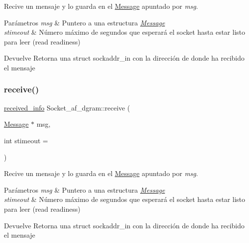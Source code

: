 Recive un mensaje y lo guarda en el \hyperlink{structMessage}{Message} apuntado por {\itshape msg}. 


\begin{DoxyParams}{Parámetros}
{\em msg} & Puntero a una estructura {\itshape \hyperlink{structMessage}{Message}} \\
\hline
{\em stimeout} & Número máximo de segundos que esperará el socket hasta estar listo para leer (read readiness) \\
\hline
\end{DoxyParams}
\begin{DoxyReturn}{Devuelve}
Retorna una struct sockaddr\+\_\+in con la dirección de donde ha recibido el mensaje 
\end{DoxyReturn}
\mbox{\label{classSocket__af__dgram_ac7d122d2317d980c48964076c3c7e2bb}} 
\subsubsection{\texorpdfstring{receive()}{receive()}\hspace{0.1cm}{\footnotesize\ttfamily [2/2]}}
{\footnotesize\ttfamily \hyperlink{structreceived__info}{received\+\_\+info} Socket\+\_\+af\+\_\+dgram\+::receive (\begin{DoxyParamCaption}\item[{\hyperlink{structMessage}{Message} $\ast$}]{msg,  }\item[{int}]{stimeout = {} }\end{DoxyParamCaption})}



Recive un mensaje y lo guarda en el \hyperlink{structMessage}{Message} apuntado por {\itshape msg}. 


\begin{DoxyParams}{Parámetros}
{\em msg} & Puntero a una estructura {\itshape \hyperlink{structMessage}{Message}} \\
\hline
{\em stimeout} & Número máximo de segundos que esperará el socket hasta estar listo para leer (read readiness) \\
\hline
\end{DoxyParams}
\begin{DoxyReturn}{Devuelve}
Retorna una struct sockaddr\+\_\+in con la dirección de donde ha recibido el mensaje 
\end{DoxyReturn}
\mbox{\label{classSocket__af__dgram_a744bb661eeebe5b5cdfca0028da6bd88}} 
